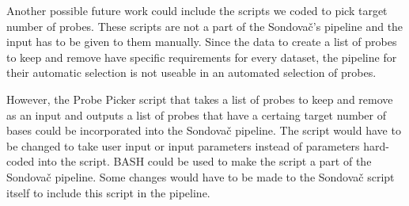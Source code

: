 Another possible future work could include the scripts we coded to pick target number of probes. These scripts are not a part of the Sondovač's pipeline and the input has to be given to them manually. Since the data to create a list of probes to keep and remove have specific requirements for every dataset, the pipeline for their automatic selection is not useable in an automated selection of probes. 

However, the Probe Picker script that takes a list of probes to keep and remove as an input and outputs a list of probes that have a certaing target number of bases could be incorporated 
into the Sondovač pipeline. The script would have to be changed to take user input or input parameters instead of parameters hard-coded into the script. BASH could be used to make the script 
a part of the Sondovač pipeline. Some changes would have to be made to the Sondovač script itself to include this script in the pipeline. 

